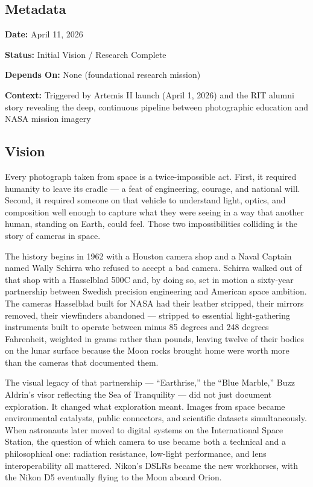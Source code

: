 \documentclass[11pt,letterpaper]{article}
\newcommand{\metafield}[2]{\textbf{\sffamily #1} #2\par}
\begin{document}
\subsection*{Metadata}
\metafield{Date:}{April 11, 2026}
\metafield{Status:}{Initial Vision / Research Complete}
\metafield{Depends On:}{None (foundational research mission)}
\metafield{Context:}{Triggered by Artemis II launch (April 1, 2026) and the RIT alumni story revealing the deep, continuous pipeline between photographic education and NASA mission imagery}

\subsection{Vision}

Every photograph taken from space is a twice-impossible act. First, it required humanity to leave its cradle --- a feat of engineering, courage, and national will. Second, it required someone on that vehicle to understand light, optics, and composition well enough to capture what they were seeing in a way that another human, standing on Earth, could feel. Those two impossibilities colliding is the story of cameras in space.

The history begins in 1962 with a Houston camera shop and a Naval Captain named Wally Schirra who refused to accept a bad camera. Schirra walked out of that shop with a Hasselblad 500C and, by doing so, set in motion a sixty-year partnership between Swedish precision engineering and American space ambition. The cameras Hasselblad built for NASA had their leather stripped, their mirrors removed, their viewfinders abandoned --- stripped to essential light-gathering instruments built to operate between minus 85 degrees and 248 degrees Fahrenheit, weighted in grams rather than pounds, leaving twelve of their bodies on the lunar surface because the Moon rocks brought home were worth more than the cameras that documented them.

The visual legacy of that partnership --- ``Earthrise,'' the ``Blue Marble,'' Buzz Aldrin's visor reflecting the Sea of Tranquility --- did not just document exploration. It changed what exploration meant. Images from space became environmental catalysts, public connectors, and scientific datasets simultaneously. When astronauts later moved to digital systems on the International Space Station, the question of which camera to use became both a technical and a philosophical one: radiation resistance, low-light performance, and lens interoperability all mattered. Nikon's DSLRs became the new workhorses, with the Nikon D5 eventually flying to the Moon aboard Orion.
\end{document}
